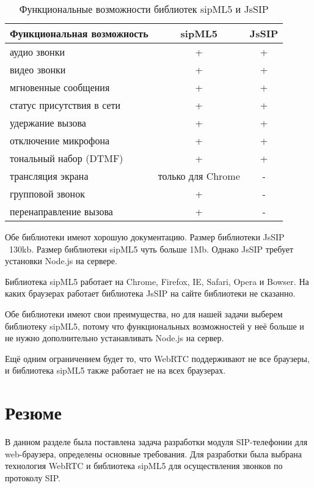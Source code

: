 \begin{table}
	\caption{Функциональные возможности библиотек sipML5 и JsSIP}
	\begin{center}
	\begin{tabular}{|l|c|c|}
	\hline 
	\textbf{Функциональная возможность} & \textbf{sipML5} & \textbf{JsSIP}	\\ 
	\hline 
	аудио звонки & + & + \\ 
	\hline 
	видео звонки & + & + \\ 
	\hline 
	мгновенные сообщения & + & + \\ 
	\hline 
	статус присутствия в сети & + & + \\ 
	\hline 
	удержание вызова & + & + \\ 
	\hline 
	отключение микрофона & + & + \\ 
	\hline 
	тональный набор (DTMF) & + & + \\ 
	\hline 
	трансляция экрана & только для Chrome & - \\ 
	\hline 
	групповой звонок & + & - \\ 
	\hline 
	перенаправление вызова & + & - \\ 
	\hline 
	\end{tabular} 
	\end{center}
	\label{table:sipml5_vs_jssip}
\end{table}

Обе библиотеки имеют хорошую документацию. Размер библиотеки JsSIP ~130kb. Размер библиотеки sipML5 чуть больше 1Mb. Однако JsSIP требует установки Node.js на сервере.

Библиотека sipML5 работает на Chrome, Firefox, IE, Safari, Opera и Bowser. На каких браузерах работает библиотека JsSIP на сайте библиотеки не сказанно.

Обе библиотеки имеют свои преимущества, но для нашей задачи выберем библиотеку sipML5, потому что функциональных возможностей у неё больше и не нужно дополнительно устанавливать Node.js на сервер.

Ещё одним ограничением будет то, что WebRTC поддерживают не все браузеры, и библиотека sipML5 также работает не на всех браузерах.

\section{Резюме}

В данном разделе была поставлена задача разработки модуля SIP-телефонии для web-браузера, определены основные требования. Для разработки была выбрана технология WebRTC и библиотека sipML5 для осуществления звонков по протоколу SIP.